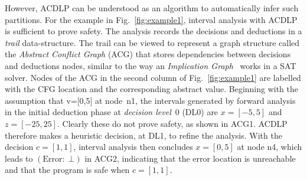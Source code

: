 However, ACDLP can be understood as an algorithm to automatically infer such
partitions.  For the example in Fig.~\ref{fig:example1}, interval analysis
with ACDLP is sufficient to prove safety.  The analysis records the
decisions and deductions in a \textit{trail} data-structure.  The trail can
be viewed to represent a graph structure called the {\em Abstract Conflict
Graph} (ACG) that stores dependencies between decisions and deductions
nodes, similar to the way an \emph{Implication Graph}~\cite{cdcl} works in a SAT solver. 
Nodes of the ACG in the second column of Fig.~\ref{fig:example1} are
labelled with the CFG location and the corresponding abstract value. 
Beginning with the assumption that v=[0,5] at node~n1, the intervals
generated by forward analysis in the initial deduction phase at
\emph{decision level}~0 (DL0) are $x=[-5,5]$ and $z=[-25,25]$.  Clearly
these do not prove safety, as shown in ACG1.  ACDLP therefore makes a
heuristic decision, at DL1, to refine the analysis.  With the decision
$c=[1,1]$, interval analysis then concludes $x=[0,5]$ at node n4, which
leads to $(\mathrm{Error}{:}\;\bot)$ in ACG2, indicating that the error
location is unreachable and that the program is safe when $c=[1,1]$.

